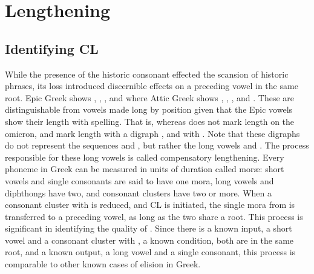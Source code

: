 \section{Lengthening}\label{sec:Lengthening}

\subsection{Identifying CL}
While the presence of the historic consonant \greek{*\w} effected the scansion of historic phrases, its loss introduced discernible effects on a preceding vowel in the same root. Epic Greek shows , , , and  where Attic Greek shows , , , and . These are distinguishable from vowels made long by position given that the Epic vowels show their length with spelling. That is, whereas  does not mark length on the omicron,  and  mark length with a digraph , and  with . Note that these digraphs do not represent the sequences  and , but rather the long vowels  and . The process responsible for these long vowels is called compensatory lengthening. Every phoneme in Greek can be measured in units of duration called mor\ae: short vowels and single consonants are said to have one mora, long vowels and diphthongs have two, and consonant clusters have two or more. When a consonant cluster with \greek{*\w} is reduced, and CL is initiated, the single mora from \greek{*\w} is transferred to a preceding vowel, as long as the two share a root. This process is significant in identifying the quality of \greek{*\w}. Since there is a known input, a short vowel and a consonant cluster with \greek{*\w},  a known condition, both are in the same root, and a known output, a long vowel and a single consonant, this process is comparable to other known cases of elision in Greek.



